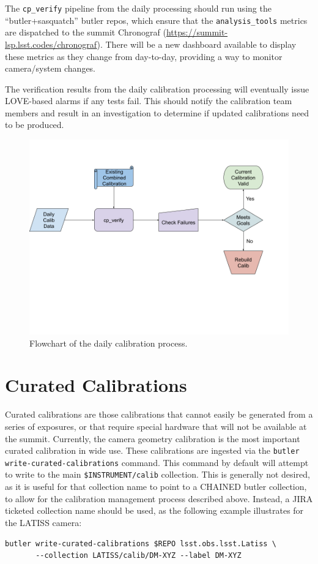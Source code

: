 \documentclass[DM,authoryear,toc]{lsstdoc}
\begin{document}
The \verb|cp_verify| pipeline from the daily processing should run using the ``butler+sasquatch'' butler repos, which ensure that the \verb|analysis_tools| metrics are dispatched to the summit Chronograf (\url{https://summit-lsp.lsst.codes/chronograf}).
There will be a new dashboard available to display these metrics as they change from day-to-day, providing a way to monitor camera/system changes.

The verification results from the daily calibration processing will eventually issue LOVE-based alarms if any tests fail.
This should notify the calibration team members and result in an investigation to determine if updated calibrations need to be produced.

\begin{figure}
  \includegraphics[width=\linewidth]{figures/daily_processing.png}
  \caption{Flowchart of the daily calibration process.}
  \label{fig:daily}
\end{figure}

\section{Curated Calibrations}

Curated calibrations are those calibrations that cannot easily be generated from a series of exposures, or that require special hardware that will not be available at the summit.
Currently, the camera geometry calibration is the most important curated calibration in wide use.
These calibrations are ingested via the \verb|butler write-curated-calibrations| command.
This command by default will attempt to write to the main \verb|$INSTRUMENT/calib| collection.
This is generally not desired, as it is useful for that collection name to point to a CHAINED butler collection, to allow for the calibration management process described above.
Instead, a JIRA ticketed collection name should be used, as the following example illustrates for the LATISS camera:
\begin{verbatim}
butler write-curated-calibrations $REPO lsst.obs.lsst.Latiss \
       --collection LATISS/calib/DM-XYZ --label DM-XYZ
\end{verbatim}
\end{document}
